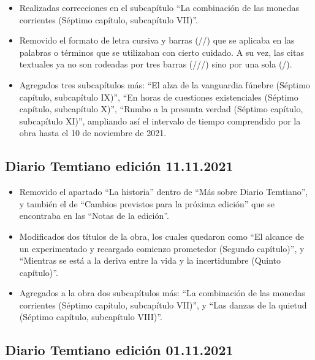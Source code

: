 \documentclass[
]{book}
\begin{document}
\begin{itemize}
\item
  Realizadas correcciones en el subcapítulo ``La combinación de las monedas corrientes (Séptimo capítulo, subcapítulo VII)''.
\item
  Removido el formato de letra cursiva y barras (//) que se aplicaba en las palabras o términos que se utilizaban con cierto cuidado. A su vez, las citas textuales ya no son rodeadas por tres barras (///) sino por una sola (/).
\item
  Agregados tres subcapítulos más: ``El alza de la vanguardia fúnebre (Séptimo capítulo, subcapítulo IX)'', ``En horas de cuestiones existenciales (Séptimo capítulo, subcapítulo X)'', ``Rumbo a la presunta verdad (Séptimo capítulo, subcapítulo XI)'', ampliando así el intervalo de tiempo comprendido por la obra hasta el 10 de noviembre de 2021.
\end{itemize}

\hypertarget{diario-temtiano-ediciuxf3n-11.11.2021}{%
\subsection*{Diario Temtiano edición 11.11.2021}\label{diario-temtiano-ediciuxf3n-11.11.2021}}

\begin{itemize}
\item
  Removido el apartado ``La historia'' dentro de ``Más sobre Diario Temtiano'', y también el de ``Cambios previstos para la próxima edición'' que se encontraba en las ``Notas de la edición''.
\item
  Modificados dos títulos de la obra, los cuales quedaron como ``El alcance de un experimentado y recargado comienzo prometedor (Segundo capítulo)'', y ``Mientras se está a la deriva entre la vida y la incertidumbre (Quinto capítulo)''.
\item
  Agregados a la obra dos subcapítulos más: ``La combinación de las monedas corrientes (Séptimo capítulo, subcapítulo VII)'', y ``Las danzas de la quietud (Séptimo capítulo, subcapítulo VIII)''.
\end{itemize}

\hypertarget{diario-temtiano-ediciuxf3n-01.11.2021}{%
\subsection*{Diario Temtiano edición 01.11.2021}\label{diario-temtiano-ediciuxf3n-01.11.2021}}
\end{document}
